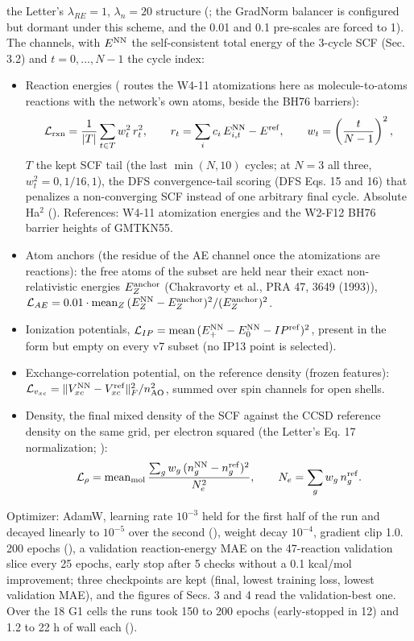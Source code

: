 \documentclass[10pt,a4paper]{article}
\begin{document}
the Letter's $\lambda_{RE} = 1$, $\lambda_n = 20$ structure (; the
GradNorm balancer is configured but dormant under this scheme, and the  0.01 and
 0.1 pre-scales are forced to 1). The channels, with $E^{\rm NN}$ the
self-consistent total energy of the 3-cycle SCF (Sec. 3.2) and $t = 0, \ldots, N-1$ the cycle
index:

\begin{itemize}
\item Reaction energies ( routes the W4-11 atomizations here as molecule-to-atoms reactions with the network's own atoms, beside the BH76 barriers): \[ \mathcal{L}_{\rm rxn} = \frac{1}{|T|}\sum_{t\in T} w_t^2\, r_t^2, \qquad r_t = \sum_i c_i\, E^{\rm NN}_{i,t} - E^{\rm ref}, \qquad w_t = \left(\frac{t}{N-1}\right)^2, \] $T$ the kept SCF tail (the last $\min(N, 10)$ cycles; at $N = 3$ all three, $w_t^2 = 0, 1/16, 1$), the DFS convergence-tail scoring (DFS Eqs. 15 and 16) that penalizes a non-converging SCF instead of one arbitrary final cycle. Absolute Ha$^2$ (). References: W4-11 atomization energies and the W2-F12 BH76 barrier heights of GMTKN55.
\item Atom anchors (the residue of the AE channel once the atomizations are reactions): the free atoms of the subset are held near their exact non-relativistic energies $E_Z^{\rm anchor}$ (Chakravorty et al., PRA 47, 3649 (1993)), $\mathcal{L}_{AE} = 0.01\cdot\mathrm{mean}_Z\, (E_Z^{\rm NN} - E_Z^{\rm anchor})^2 / (E_Z^{\rm anchor})^2$.
\item Ionization potentials, $\mathcal{L}_{IP} = \mathrm{mean}\,(E^{\rm NN}_{+} - E^{\rm NN}_0 - IP^{\rm ref})^2$, present in the form but empty on every v7 subset (no IP13 point is selected).
\item Exchange-correlation potential, on the reference density (frozen features): $\mathcal{L}_{v_{xc}} = \|V_{xc}^{\rm NN} - V_{xc}^{\rm ref}\|_F^2 / n_{\rm AO}^2$, summed over spin channels for open shells.
\item Density, the final mixed density of the SCF against the CCSD reference density on the same grid, per electron squared (the Letter's Eq. 17 normalization; ): \[ \mathcal{L}_{\rho} = \mathrm{mean}_{\rm mol}\,\frac{\sum_g w_g\,(n^{\rm NN}_g - n^{\rm ref}_g)^2}{N_e^2}, \qquad N_e = \sum_g w_g\, n^{\rm ref}_g . \]
\end{itemize}

Optimizer: AdamW, learning rate $10^{-3}$ held for the first half of the run and decayed
linearly to $10^{-5}$ over the second (), weight decay $10^{-4}$, gradient
clip 1.0. 200 epochs (), a validation reaction-energy MAE on the 47-reaction validation
slice every 25 epochs, early stop after 5 checks without a 0.1 kcal/mol improvement; three
checkpoints are kept (final, lowest training loss, lowest validation MAE), and the figures of
Secs. 3 and 4 read the validation-best one. Over the 18 G1 cells the runs took 150 to 200
epochs (early-stopped in 12) and 1.2 to 22 h of wall each ().
\end{document}
